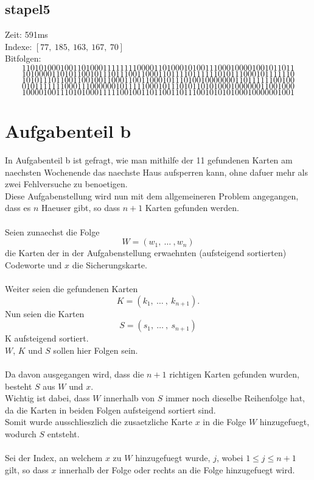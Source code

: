 \documentclass[a4paper,10pt,ngerman]{scrartcl}
\begin{document}
{\subsection{stapel5}
Zeit: 591ms \\
Indexe: $[77, \ 185, \ 163, \ 167, \ 70]$ \\
Bitfolgen:
$$
1101010001001101000111111110000110100010100111000100001001011011
$$
$$
1010000110101100101110111001100011011110111111010111000101111110
$$
$$
1010111011001100100110001100110001011101001000000011011111100100
$$
$$
0101111111000111000000101111100010111010110101000100000011001000
$$
$$
1000010011101010001111100100110110011011100101010100010000001001
$$

\section{Aufgabenteil b}
In Aufgabenteil b ist gefragt, wie man mithilfe der 11 gefundenen Karten am naechsten Wochenende das naechste Haus aufsperren kann, ohne dafuer mehr als zwei Fehlversuche zu benoetigen.\\
Diese Aufgabenstellung wird nun mit dem allgemeineren  Problem angegangen, dass es $n$ Haeuser gibt, so dass $n+1$ Karten gefunden werden.
\\\\
Seien zunaechst die Folge 
$$
W = (w_1, \ \dots \ , w_n)
$$
die Karten der in der Aufgabenstellung erwaehnten (aufsteigend sortierten) Codeworte und $x$ die Sicherungskarte.\\
\\
Weiter seien die gefundenen Karten
$$K = (k_1, \ \dots \ , \ k_{n+1}). $$
Nun seien die Karten 
$$S = (s_1, \ \dots \ , \ s_{n+1}) $$
K aufsteigend sortiert.\\
$W$, $K$ und $S$ sollen hier Folgen sein.
\\\\
Da davon ausgegangen wird, dass die $n+1$ richtigen Karten gefunden wurden, besteht $S$ aus $W$ und $x$.
\\
Wichtig ist dabei, dass $W$ innerhalb von $S$ immer noch dieselbe Reihenfolge hat, da die Karten in beiden Folgen aufsteigend sortiert sind.\\
Somit wurde ausschlieszlich die zusaetzliche Karte $x$ in die Folge $W$ hinzugefuegt, wodurch $S$ entsteht.
\\\\
Sei der Index, an welchem $x$ zu $W$ hinzugefuegt wurde, $j$, wobei $1 \leq j \leq n+1$ gilt, so dass $x$ innerhalb der Folge oder rechts an die Folge hinzugefuegt wird.
}
\end{document}

